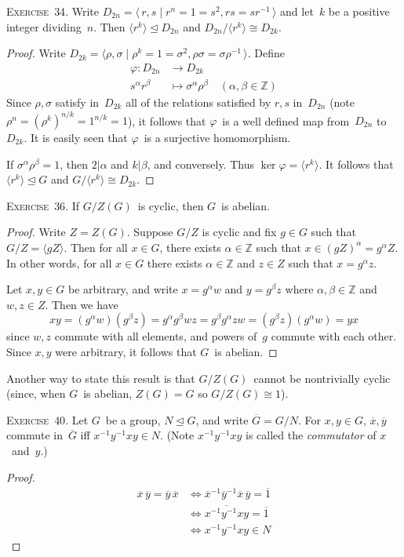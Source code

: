 \documentclass[letterpaper]{article}
\newcommand{\exercise}[1]{\goodbreak\noindent\textsc{Exercise~{#1}.}}
\newcommand{\Z}{\mathbb{Z}}
\newcommand{\iso}{\cong}
\newcommand{\normal}{\trianglelefteq}
\newcommand{\res}[1]{\overline{#1}}
\newcommand{\gen}[1]{\langle{#1}\rangle}
\begin{document}
\bigskip
\exercise{34}
Write $D_{2n}=\gen{\,r,s\mid r^n=1=s^2, rs=sr^{-1}\,}$ and let~$k$ be a positive integer dividing~$n$. Then $\gen{r^k}\normal D_{2n}$ and $D_{2n}/\gen{r^k}\iso D_{2k}$.
\begin{proof}
Write $D_{2k}=\gen{\rho,\sigma\mid \rho^k=1=\sigma^2,\rho\sigma=\sigma\rho^{-1}\,}$. Define
\begin{align*}
\varphi:D_{2n}&\to D_{2k}\\
s^{\alpha}r^{\beta}&\mapsto\sigma^{\alpha}\rho^{\beta}\quad(\alpha,\beta\in\Z)
\end{align*}
Since $\rho,\sigma$ satisfy in~$D_{2k}$ all of the relations satisfied by $r,s$ in~$D_{2n}$ (note $\rho^n=(\rho^k)^{n/k}=1^{n/k}=1$), it follows that $\varphi$~is a well defined map from~$D_{2n}$ to~$D_{2k}$. It is easily seen that $\varphi$~is a surjective homomorphism.

If $\sigma^{\alpha}\rho^{\beta}=1$, then $2|\alpha$ and $k|\beta$, and conversely. Thus $\ker\varphi=\gen{r^k}$. It follows that $\gen{r^k}\normal G$ and $G/\gen{r^k}\iso D_{2k}$.
\end{proof}

\exercise{36}
If $G/Z(G)$~is cyclic, then $G$~is abelian.
\begin{proof}
Write $Z=Z(G)$. Suppose $G/Z$ is cyclic and fix $g\in G$ such that $G/Z=\gen{gZ}$. Then for all $x\in G$, there exists $\alpha\in\Z$ such that $x\in(gZ)^{\alpha}=g^{\alpha}Z$. In other words, for all $x\in G$ there exists $\alpha\in\Z$ and $z\in Z$ such that $x=g^{\alpha}z$.

Let $x,y\in G$ be arbitrary, and write $x=g^{\alpha}w$ and $y=g^{\beta}z$ where $\alpha,\beta\in\Z$ and $w,z\in Z$. Then we have
$$xy=(g^{\alpha}w)(g^{\beta}z)=g^{\alpha}g^{\beta}wz=g^{\beta}g^{\alpha}zw=(g^{\beta}z)(g^{\alpha}w)=yx$$
since $w,z$ commute with all elements, and powers of~$g$ commute with each other. Since $x,y$ were arbitrary, it follows that $G$~is abelian.
\end{proof}
\noindent Another way to state this result is that $G/Z(G)$~cannot be nontrivially cyclic (since, when $G$~is abelian, $Z(G)=G$ so $G/Z(G)\iso 1$).

\bigskip
\exercise{40}
Let $G$~be a group, $N\normal G$, and write $\res{G}=G/N$. For $x,y\in G$, $\res{x},\res{y}$ commute in~$\res{G}$ iff $x^{-1}y^{-1}xy\in N$. (Note $x^{-1}y^{-1}xy$ is called the \emph{commutator} of $x$~and~$y$.)
\begin{proof}
\begin{align*}
\res{x}\,\res{y}=\res{y}\,\res{x}&\iff\res{x}^{-1}\res{y}^{-1}\res{x}\,\res{y}=\res{1}\\
	&\iff\res{x^{-1}y^{-1}xy}=\res{1}\\
	&\iff x^{-1}y^{-1}xy\in N
\end{align*}
\end{proof}
\end{document}

